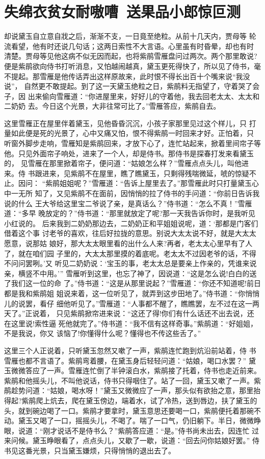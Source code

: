 \chapter{失绵衣贫女耐嗷嘈~送果品小郎惊叵测}

却说黛玉自立意自戕之后，渐渐不支，一日竟至绝粒。从前十几天内，贾母等
轮流看望，他有时还说几句话；这两日索性不大言语。心里虽有时昏晕，却也有时
清楚。贾母等见他这病不似无因而起，也将紫鹃雪雁盘问过两次。两个那里敢说?
便是紫鹃欲向侍书打听消息，又怕越闹越真，黛玉更死得快了，所以见了侍书，毫
不提起。那雪雁是他传话弄出这样原故来，此时恨不得长出百十个嘴来说“我没说”，
自然更不敢提起。到了这一天黛玉绝粒之日，紫鹃料无指望了，守着哭了会子，因
出来偷向雪雁道：“你进屋里来，好好儿的守着他，我去回老太太、太太和二奶奶
去。今日这个光景，大非往常可比了。”雪雁答应，紫鹃自去。

这里雪雁正在屋里伴着黛玉，见他昏昏沉沉，小孩子家那里见过这个样儿，只
打量如此便是死的光景了，心中又痛又怕，恨不得紫鹃一时回来才好。正怕着，只
听窗外脚步走响，雪雁知是紫鹃回来，才放下心了，连忙站起来，掀着里间帘子等
他。只见外面帘子响处，进来了一个人，却是侍书。那侍书是探春打发来看黛玉的，
见雪雁在那里掀着帘子，便问道：“姑娘怎么样？”雪雁点点头儿，叫他进来。侍
书跟进来，见紫鹃不在屋里，瞧了瞧黛玉，只剩得残喘微延，唬的惊疑不止。因问：
“紫鹃姐姐呢？”雪雁道：“告诉上屋里去了。”那雪雁此时只打量黛玉心中一无所
知了，又见紫鹃不在面前，因悄悄的拉了侍书的手问道：“你前日告诉我说的什么
王大爷给这里宝二爷说了亲，是真话么？”侍书道：“怎么不真！”雪雁道：“多早
晚放定的？”侍书道：“那里就放定了呢?那一天我告诉你时，是我听见小红说的。
后来我到二奶奶那边去，二奶奶正和平姐姐说呢，道：‘那都是门客们借着这个事
讨老爷的喜欢，往后好拉拢的意思。别说大太太说不好，就是大太太愿意，说那姑
娘好，那大太太眼里看的出什么人来?再者，老太太心里早有了人了，就在咱们园
子里的，大太太那里摸的着底呢。老太太不过因老爷的话，不得不问问罢咧。’又
听见二奶奶说：‘宝玉的事，老太太总是要亲上作亲的，凭谁来说亲，横竖不中用。’”
雪雁听到这里，也忘了神了，因说道：“这是怎么说!白白的送了我们这一位的命
了。”侍书道：“这是从那里说起？”雪雁道：“你还不知道呢!前日都是我和紫鹃姐
姐说来着，这一位听见了，就弄到这步田地了。”侍书道：“你悄悄儿的说罢，看仔
细他听见了。”雪雁道：“人事都不醒了，瞧瞧罢，左不过在这一两天了。”正说着，
只见紫鹃掀帘进来说：“这还了得!你们有什么话还不出去说，还在这里说!索性逼
死他就完了。”侍书道：“我不信有这样奇事。”紫鹃道：“好姐姐，不是我说，你又
该恼了!你懂得什么呢？懂得也不传这些舌了。”

这里三个人正说着，只听黛玉忽然又嗽了一声，紫鹃连忙跑到炕沿前站着，侍
书雪雁也都不言语了。紫鹃弯着腰，在黛玉身后轻轻问道：“姑娘，喝口水罢？”
黛玉微微答应了一声。雪雁连忙倒了半钟滚白水，紫鹃接了托着，侍书也走近前来。
紫鹃和他摇头儿，不叫他说话，侍书只得咽住了。站了一回，黛玉又嗽了一声。紫
鹃趁势问道：“姑娘，喝水呀！”黛玉又微微应了一声，那头似有欲抬之意，那里抬
得起?紫鹃爬上炕去，爬在黛玉傍边，端着水，试了冷热，送到唇边，扶了黛玉的
头，就到碗边喝了一口。紫鹃才要拿时，黛玉意思还要喝一口，紫鹃便托着那碗不
动。黛玉又喝了一口，摇摇头儿，不喝了。喘了一口气，仍旧躺下。半日，微微睁
眼，说道：“刚才说话不是侍书么？”紫鹃答应道：“是。”侍书尚未出去，因连忙
过来问候。黛玉睁眼看了，点点头儿，又歇了一歇，说道：“回去问你姑娘好罢。”
侍书见这番光景，只当黛玉嫌烦，只得悄悄的退出去了。


